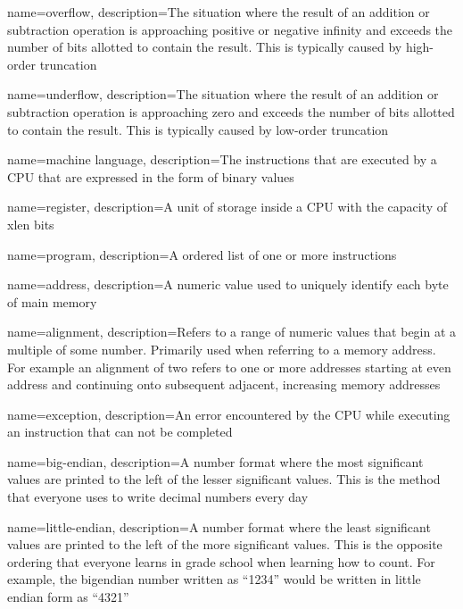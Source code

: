 {
	name=overflow,
	description={The situation where the result of an addition or
		subtraction operation is approaching positive or negative
		infinity and exceeds the number of bits allotted to contain
		the result.  This is typically caused by high-order truncation}
}

{
	name=underflow,
	description={The situation where the result of an addition or
		subtraction operation is approaching zero and exceeds the number
		of bits allotted to contain the result.  This is typically
        caused by low-order truncation}
}

{
	name={machine language},
	description={The instructions that are executed by a CPU that are expressed
		in the form of \gls{binary} values}
}

{
	name={register},
	description={A unit of storage inside a CPU with the capacity of \gls{xlen} \gls{bit}s}
}

{
	name={program},
	description={A ordered list of one or more instructions}
}

{
	name={address},
	description={A numeric value used to uniquely identify each \gls{byte} of main memory}
}

{
	name={alignment},
	description={Refers to a range of numeric values that begin
		at a multiple of some number.  Primarily used when referring to
		a memory address.  For example an alignment of two refers to one
		or more addresses starting at even address and continuing onto
		subsequent adjacent, increasing memory addresses}
}

{
	name={exception},
	description={An error encountered by the CPU while executing an instruction
		that can not be completed}
}

{
	name={big-endian},
	description={A number format where the most significant values are
	printed to the left of the lesser significant values.  This is the
	method that everyone uses to write decimal numbers every day}
}

{
	name={little-endian},
	description={A number format where the least significant values are
		printed to the left of the more significant values.  This is the
		opposite ordering that everyone learns in grade school when learning
		how to count.  For example, the \gls{bigendian} number written as ``1234''
		would be written in little endian form as ``4321''}
}

